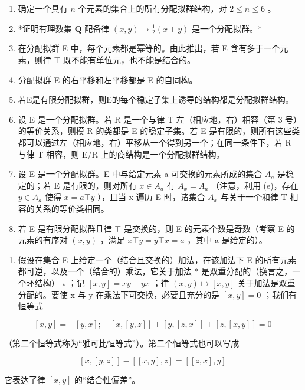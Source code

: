 \begin{enumerate}
\def\labelenumi{(\alph{enumi})}
\item
  确定一个具有 \(n\) 个元素的集合上的所有分配拟群结构，对 \(2 \leqslant n \leqslant 6\) 。
\item
  *证明有理数集 \(\mathbf{Q}\) 配备律 \((x,y)\mapsto\frac{1}{2}(x+y)\) 是一个分配拟群。*
\item
  在分配拟群 E 中，每个元素都是幂等的。由此推出，若 E 含有多于一个元素，则律 \(\top\) 既不能有单位元，也不能是结合的。
\item
  分配拟群 E 的右平移和左平移都是 E 的自同构。
\item
  若E是有限分配拟群，则E的每个稳定子集上诱导的结构都是分配拟群结构。
\item
  设 E 是一个分配拟群。若 R 是一个与律 T 左（相应地，右）相容（第 3 号）的等价关系，则模 R 的类都是 E 的稳定子集。若 E 是有限的，则所有这些类都可以通过左（相应地，右）平移从一个得到另一个；在同一条件下，若 R 与律 T 相容，则 E/R 上的商结构是一个分配拟群结构。
\item
  设 E 是一个分配拟群。E 中与给定元素 a 可交换的元素所成的集合 \(A_{a}\) 是稳定的；若 E 是有限的，则对所有 \(x \in A_{a}\) 有 \(A_{x} = A_{a}\) （注意，利用 (e)，存在 \(y \in A_{a}\) 使得 \(x = a \top y\) ），且当 x 遍历 E 时，诸集合 \(A_{x}\) 与关于一个和律 T 相容的关系的等价类相同。
\item
  若 E 是有限分配拟群且律 \(\top\) 是交换的，则 E 的元素个数是奇数（考察 E 的元素的有序对 \((x,y)\) ，满足 \(x\top y=y\top x=a\) ，其中 a 是给定的）。
\end{enumerate}

\begin{enumerate}
\def\labelenumi{\arabic{enumi}.}
\setcounter{enumi}{6}
\tightlist
\item
  假设在集合 E 上给定一个（结合且交换的）加法，在该加法下 E 的所有元素都可逆，以及一个（结合的）乘法，它关于加法 \(*\) 是双重分配的（换言之，一个环结构） \(_{*}\) ；记 \([x,y]=xy-yx\) ；律 \((x,y)\mapsto[x,y]\) 关于加法是双重分配的。要使 x 与 y 在乘法下可交换，必要且充分的是 \([x,y]=0\) ；我们有恒等式
\end{enumerate}

\[
[ x, y ] = - [ y, x ]; \quad [ x, [ y, z ] ] + [ y, [ z, x ] ] + [ z, [ x, y ] ] = 0
\]

（第二个恒等式称为“雅可比恒等式”）。第二个恒等式也可以写成

\[
[ x, [ y, z ] ] - [ [ x, y ], z ] = [ [ z, x ], y ]
\]

它表达了律 \([x, y]\) 的“结合性偏差”。

